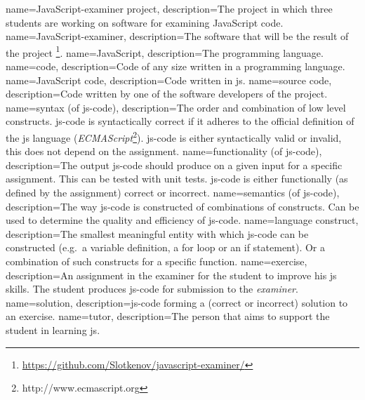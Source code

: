 {
  name=JavaScript-examiner project,
  description={The project in which three students are working
    on software for examining JavaScript code.}
}
{
  name=JavaScript-examiner,
  description={The software that will be the result of the \gls{project}
    \footnote{\url{https://github.com/Slotkenov/javascript-examiner/}}.}
}
{
  name=JavaScript,
  description={The programming language.}
}
{
  name=code,
  description={Code of any size written in a programming language.}
}
{
  name=JavaScript code,
  description={Code written in \gls{js}.}
}
{
  name=source code,
  description={Code written by one of the software developers
    of the \gls{project}.}
}
{
  name=syntax (of \gls{js-code}),
  description={The order and combination of low level \glspl{construct}.
    \gls{js-code} is syntactically correct if it adheres
    to the official definition of the \gls{js} language
    ({\em ECMAScript}\footnote{http://www.ecmascript.org}).
    \gls{js-code} is either syntactically valid or invalid,
    this does not depend on the assignment.}
}
{
  name=functionality (of \gls{js-code}),
  description={The output \gls{js-code} should produce
    on a given input for a specific assignment.
    This can be tested with unit tests.
    \Gls{js-code} is either functionally (as defined by the assignment)
    correct or incorrect.}
}
{
  name=semantics (of \gls{js-code}),
  description={The way \gls{js-code} is constructed
    of combinations of \glspl{construct}.
    Can be used to determine the quality and efficiency of \gls{js-code}.}
}
{
  name=language construct,
  description={The smallest meaningful entity
    with which \gls{js-code} can be constructed
    (e.g.\ a variable definition, a for loop or an if statement).
    Or a combination of such \glspl{construct} for a specific function.}
}
{
  name=exercise,
  description={An assignment in the \gls{examiner} for the \gls{student}
    to improve his \gls{js} skills.
    The student produces \gls{js-code} for submission to the {\em examiner}.}
}
{
  name=solution,
  description={\Gls{js-code} forming a
    (correct or incorrect) solution to an exercise.}
}
{
  name=tutor,
  description={The person that aims to support the \gls{student}
    in learning \gls{js}.}
}
